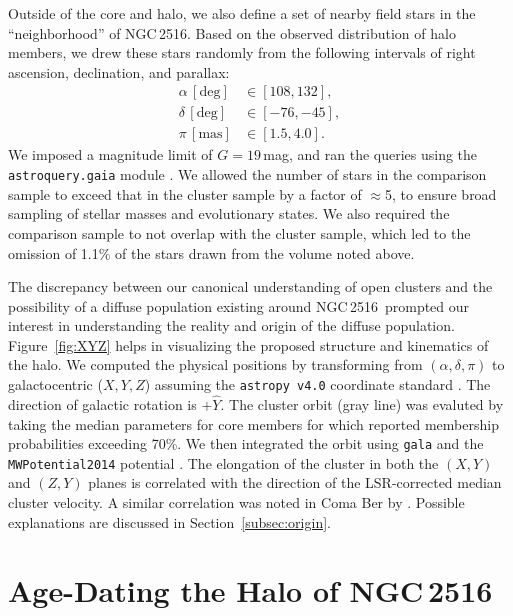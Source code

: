 \documentclass[12pt,twocolumn,tighten]{aastex63}
\newcommand{\cn}{NGC\,2516} %
\begin{document}
Outside of the core and halo, we also define a set of nearby field
stars in the ``neighborhood'' of \cn.  Based on the observed
distribution of halo members, we drew these stars randomly from the
following intervals of right ascension, declination, and parallax:
\begin{align}
  \alpha\,[\mathrm{deg}] &\in [108, 132], \\
  \delta\,[\mathrm{deg}] &\in [-76, -45], \\
  \pi\,[\mathrm{mas}] &\in [1.5, 4.0].
\end{align}
We imposed a magnitude limit of $G=19$\,mag, and ran the queries using
the \texttt{astroquery.gaia} module \citep{astroquery_2018}.  We
allowed the number of stars in the comparison sample to exceed that in
the cluster sample by a factor of $\approx$5, to ensure broad sampling
of stellar masses and evolutionary states.  We also required the
comparison sample to not overlap with the cluster sample, which led to
the omission of 1.1\% of the stars drawn from the volume noted above.

The discrepancy between our canonical understanding of open clusters
and the possibility of a diffuse population existing around \cn\
prompted our interest in understanding the reality and origin of the
diffuse population.  Figure~\ref{fig:XYZ} helps in visualizing the
proposed structure and kinematics of the halo.  We computed the
physical positions by transforming from $(\alpha, \delta, \pi)$ to
galactocentric ($X,Y,Z$) assuming the \texttt{astropy v4.0} coordinate
standard \citep{astropy_2018}.  The direction of galactic rotation is
$+\hat{Y}$. The cluster orbit (gray line) was evaluted by taking the
median parameters for core members for which
 reported membership probabilities
exceeding 70\%.  We then integrated the orbit using \texttt{gala} and
the \texttt{MWPotential2014} potential \citep{bovy_galpy_2015,gala}.
The elongation of the cluster in both the $(X,Y)$ and $(Z,Y)$ planes
is correlated with the direction of the LSR-corrected median cluster
velocity.  A similar correlation was noted in Coma Ber by
\citet{tang_comaber_2019}.  Possible explanations are discussed in
Section~\ref{subsec:origin}.




\section{Age-Dating the Halo of NGC\,2516}
\label{sec:agedate}
\end{document}

